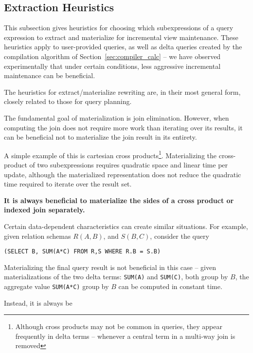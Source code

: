 \subsection{Extraction Heuristics}
\label{sec:advanced-rewriting}

This subsection gives heuristics for choosing which subexpressions of
a query expression to extract and materialize for incremental view maintenance.  These heuristics apply to user-provided queries, as well as delta queries created by the compilation algorithm of Section~\ref{sec:compiler_calc} -- we have observed experimentally that under certain conditions, less aggressive incremental maintenance can be beneficial.  

The heuristics for extract/materialize rewriting are, in their most general form, closely related to those for query planning.  

The fundamental goal of materialization is join elimination.  However, when computing the join does not require more work than iterating over its results, it can be beneficial not to materialize the join result in its entirety. 

A simple example of this is cartesian cross products\footnote{Although cross products may not be common in queries, they appear frequently in delta terms -- whenever a central term in a multi-way join is removed}.  Materializing the cross-product of two subexpressions requires quadratic space and linear time per update, although the materialized representation does not reduce the quadratic time required to iterate over the result set.  

{\bf It is always beneficial to materialize the sides of a cross product or indexed join separately.}

Certain data-dependent characteristics can create similar situations.  For example, given relation schemas $R(A,B)$, and $S(B,C)$, consider the query

\texttt{(SELECT B, SUM(A*C) FROM R,S WHERE R.B = S.B)}

Materializing the final query result is not beneficial in this case -- given materializations of the two delta terms: {\tt SUM(A)} and {\tt SUM(C)}, both group by $B$, the aggregate value {\tt SUM(A*C)} group by $B$ can be computed in constant time.





Instead, it is always be



